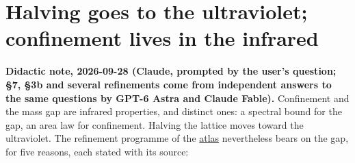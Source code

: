 \documentclass[11pt,a4paper]{article}
\begin{document}
\hypertarget{halving-goes-to-the-ultraviolet-confinement-lives-in-the-infrared}{%
\section{Halving goes to the ultraviolet; confinement lives in the
infrared}\label{halving-goes-to-the-ultraviolet-confinement-lives-in-the-infrared}}

\textbf{Didactic note, 2026-09-28 (Claude, prompted by the user's
question; §7, §3b and several refinements come from independent answers
to the same questions by GPT-6 Astra and Claude Fable).} Confinement and
the mass gap are infrared properties, and distinct ones: a spectral
bound for the gap, an area law for confinement. Halving the lattice
moves toward the ultraviolet. The refinement programme of the
\href{halving-atlas.md}{atlas} nevertheless bears on the gap, for five
reasons, each stated with its source:
\end{document}
